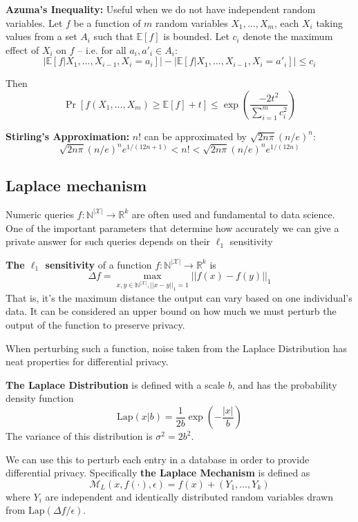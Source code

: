 \documentclass[a4paper]{article}
\begin{document}
\begin{mdframed}
    \textbf{Azuma's Inequality:} Useful when we do not have independent random variables. Let $f$ be a function of $m$ random variables $X_1, \dots, X_m$, each $X_i$ taking values from a set $A_i$ such that $\mathds{E}[f]$ is bounded. Let $c_i$ denote the maximum effect of $X_i$ on $f$ -- i.e. for all $a_i, a'_i \in A_i$:
    $$\left| \mathds{E}[f | X_1, \dots, X_{i-1}, X_i = a_i ] \right| - \left| \mathds{E}[f | X_1, \dots, X_{i-1}, X_i = a'_i ] \right| \leq c_i$$
    
    Then
    $$\Pr[f(X_1, \dots, X_m) \geq \mathds{E}[f] + t] \leq \exp \left( \frac{-2t^2}{\sum_{i=1}^m c_i^2} \right)$$
\end{mdframed}

\begin{mdframed}
    \textbf{Stirling's Approximation:} $n!$ can be approximated by $\sqrt{2n\pi}(n/e)^n$:
    $$\sqrt{2n\pi}(n/e)^n e^{1/(12n+1)} < n! < \sqrt{2n\pi}(n/e)^n e^{1/(12n)}$$
\end{mdframed}

\subsection{Laplace mechanism}

Numeric queries $f : \mathbb{N}^{|\mathcal{X}|} \to \mathbb{R}^k$ are often used and fundamental to data science. One of the important parameters that determine how accurately we can give a private answer for such queries depends on their $\ell_1$ sensitivity

\begin{mdframed}
    \textbf{The $\ell_1$ sensitivity} of a function $f : \mathbb{N}^{|\mathcal{X}|} \to \mathbb{R}^k$ is
    $$\Delta f = \max_{x,y \in \mathbb{N}^{|\mathcal{X}|}, ||x-y||_1 = 1} ||f(x) - f(y)||_1$$
    That is, it's the maximum distance the output can vary based on one individual's data. It can be considered an upper bound on how much we must perturb the output of the function to preserve privacy.
\end{mdframed}

When perturbing such a function, noise taken from the Laplace Distribution has neat properties for differential privacy.

\newcommand{\laplace}{\text{Lap}}

\textbf{The Laplace Distribution} is defined with a scale $b$, and has the probability density function
$$\laplace(x|b) = \frac{1}{2b} \exp \left( -\frac{|x|}{b} \right)$$
The variance of this distribution is $\sigma^2 = 2b^2$.

We can use this to perturb each entry in a database in order to provide differential privacy. Specifically \textbf{the Laplace Mechanism} is defined as
$$\mathcal{M}_L(x, f(\cdot), \epsilon) = f(x) + (Y_1, \dots, Y_k)$$
where $Y_i$ are independent and identically distributed random variables drawn from $\laplace(\Delta f/\epsilon)$.
\end{document}
